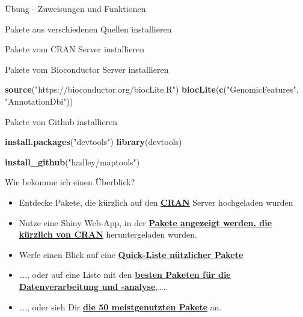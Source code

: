 \documentclass[ignorenonframetext,]{beamer}
\newenvironment{Shaded}{\begin{snugshade}}{\end{snugshade}}
\newcommand{\KeywordTok}[1]{\textcolor[rgb]{0.26,0.66,0.93}{\textbf{#1}}}
\newcommand{\NormalTok}[1]{\textcolor[rgb]{0.74,0.68,0.62}{#1}}
\newcommand{\StringTok}[1]{\textcolor[rgb]{0.02,0.61,0.04}{#1}}
\begin{document}
\begin{frame}[fragile]{Übung - Zuweisungen und Funktionen}
\begin{frame}[fragile]{Pakete aus verschiedenen Quellen installieren}
\begin{block}{Pakete vom CRAN Server installieren}
\end{block}

\begin{block}{Pakete vom Bioconductor Server installieren}

\begin{Shaded}
\begin{Highlighting}[]
\KeywordTok{source}\NormalTok{(}\StringTok{"https://bioconductor.org/biocLite.R"}\NormalTok{)}
\KeywordTok{biocLite}\NormalTok{(}\KeywordTok{c}\NormalTok{(}\StringTok{"GenomicFeatures"}\NormalTok{, }\StringTok{"AnnotationDbi"}\NormalTok{))}
\end{Highlighting}
\end{Shaded}

\end{block}

\begin{block}{Pakete von Github installieren}

\begin{Shaded}
\begin{Highlighting}[]
\KeywordTok{install.packages}\NormalTok{(}\StringTok{"devtools"}\NormalTok{)}
\KeywordTok{library}\NormalTok{(devtools)}

\KeywordTok{install_github}\NormalTok{(}\StringTok{"hadley/maptools"}\NormalTok{)}
\end{Highlighting}
\end{Shaded}

\end{block}

\end{frame}

\begin{frame}{Wie bekomme ich einen Überblick?}
\protect\hypertarget{wie-bekomme-ich-einen-uberblick}{}

\begin{itemize}
\item
  Entdecke Pakete, die kürzlich auf den
  \href{https://mran.microsoft.com/packages/}{\textbf{CRAN}} Server
  hochgeladen wurden
\item
  Nutze eine Shiny Web-App, in der
  \href{https://gallery.shinyapps.io/cran-gauge/}{\textbf{Pakete
  angezeigt werden, die kürzlich von CRAN}} heruntergeladen wurden.
\item
  Werfe einen Blick auf eine
  \href{https://support.rstudio.com/hc/en-us/articles/201057987-Quick-list-of-useful-R-packages}{\textbf{Quick-Liste
  nützlicher Pakete}}
\item
  \ldots{}., oder auf eine Liste mit den
  \href{http://www.computerworld.com/article/2921176/business-intelligence/great-r-packages-for-data-import-wrangling-visualization.html}{\textbf{besten
  Paketen für die Datenverarbeitung und -analyse}},\ldots{}..
\item
  \ldots{}., oder sieh Dir
  \href{https://www.r-bloggers.com/the-50-most-used-r-packages/}{\textbf{die
  50 meistgenutzten Pakete}} an.
\end{itemize}


\end{frame}
\end{frame}
\end{document}
